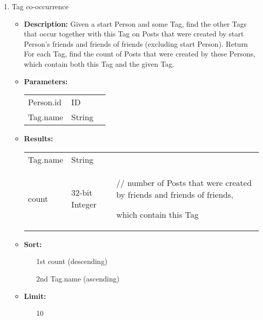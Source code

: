 {\begin{enumerate}
        \item Tag co-occurrence
            \begin{itemize}
                \item \textbf{Description:}
                    Given a start Person and some Tag, find the other Tags that occur
                    together with this Tag on Posts that were created by start Person's
                    friends and friends of friends (excluding start Person).  Return
                    For each Tag, find the count of Posts that were created by these
                    Persons, which contain both this Tag and the given Tag.
                \item \textbf{Parameters:} \\
                    \begin{tabular}{lll}
                        Person.id 										& ID & \\
                        Tag.name 	 									& String & \parbox[t]{20cm}{\par \strut} \\
                    \end{tabular}
                \item \textbf{Results:} \\
                    \begin{tabular}{lll}
                        Tag.name 	 						& String & \parbox[t]{20cm}{\par \strut} \\
                        count 								& 32-bit Integer & \parbox[t]{20cm}{// number of Posts that were created by friends and friends of friends, \par
                    which contain this Tag\strut} \\
                \end{tabular}
                \item \textbf{Sort:}
                  \begin{itemize}
                    \item[1st] count (descending)
                    \item[2nd] Tag.name (ascending)
                  \end{itemize}
                \item \textbf{Limit:}
                  \begin{itemize}
                    \item[] 10
                  \end{itemize}
        \end{itemize}


\end{enumerate}}
